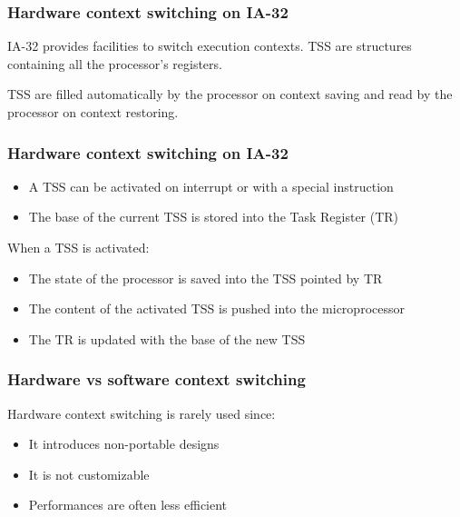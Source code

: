 
\begin{frame}
  \frametitle{Hardware context switching on IA-32}

  IA-32 provides facilities to switch execution contexts. TSS are
  structures containing all the processor's registers.

  \begin{center}
  \end{center}

  TSS are filled automatically by the processor on context saving and
  read by the processor on context restoring.

\end{frame}


\begin{frame}
  \frametitle{Hardware context switching on IA-32}

  \begin{itemize}
  \item
    A TSS can be activated on interrupt or with a special instruction
  \item
    The base of the current TSS is stored into the Task Register (TR)
  \end{itemize}

  \-

  When a TSS is activated:

  \begin{itemize}
  \item
    The state of the processor is saved into the TSS pointed by TR
  \item
    The content of the activated TSS is pushed into the microprocessor
  \item
    The TR is updated with the base of the new TSS
  \end{itemize}

\end{frame}


\begin{frame}
  \frametitle{Hardware vs software context switching}

  Hardware context switching is rarely used since:

  \begin{itemize}
  \item
    It introduces non-portable designs
  \item
    It is not customizable
  \item
    Performances are often less efficient
  \end{itemize}

\end{frame}

